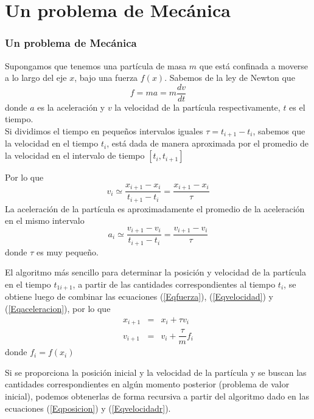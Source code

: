 \section{Un problema de Mec\'{a}nica}
\begin{frame}
\frametitle{Un problema de Mec\'{a}nica}
Supongamos que tenemos una part\'{i}cula de masa $m$ que est\'{a} confinada a moverse a lo largo del eje $x$, bajo una fuerza $f(x)$. Sabemos de la ley de Newton que
\begin{equation}\label{Eqfuerza}
f = ma = m \dfrac{dv}{dt}
\end{equation}
donde $a$ es la aceleraci\'{o}n y $v$ la velocidad de la part\'{i}cula respectivamente, $t$ es el tiempo.
\\
\medskip
Si dividimos el tiempo en pequeños intervalos iguales $\tau = t_{i+1} - t_{i}$, sabemos que la velocidad en el tiempo $t_{i}$, est\'{a} dada de manera aproximada por el promedio de la velocidad en el intervalo de tiempo $[t_{i}, t_{i+1}]$
\end{frame}
\begin{frame}
Por lo que
\begin{equation}\label{Eqvelocidad}
v_{i} \simeq \dfrac{x_{i+1}-x_{i}}{t_{i+1}-t_{i}} = \dfrac{x_{i+1}-x_{i}}{\tau}
\end{equation}
La aceleraci\'{o}n de la part\'{i}cula es aproximadamente el promedio de la aceleraci\'{o}n en el mismo intervalo
\begin{equation}\label{Eqaceleracion}
a_{i} \simeq \dfrac{v_{i+1}-v_{i}}{t_{i+1}-t_{i}} = \dfrac{v_{i+1}-v_{i}}{\tau}
\end{equation}
donde $\tau$ es muy pequeño.
\end{frame}
\begin{frame}
El algoritmo m\'{a}s sencillo para determinar la posici\'{o}n y velocidad de la part\'{i}cula en el tiempo $t_{1i+1}$, a partir de las cantidades correspondientes al tiempo $t_{i}$, se obtiene luego de combinar las ecuaciones (\ref{Eqfuerza}), (\ref{Eqvelocidad}) y (\ref{Eqaceleracion}), por lo que
\begin{eqnarray}
x_{i+1} &=& x_{i} + \tau v_{i} \label{Eqposicion} \\
v_{i+1} &=& v_{i} + \dfrac{\tau}{m} f_{i} \label{Eqvelocidadr}
\end{eqnarray}
donde $f_{i} = f(x_{i})$
\end{frame}
\begin{frame}
Si se proporciona la posici\'{o}n inicial y la velocidad de la part\'{i}cula y se buscan las cantidades correspondientes en alg\'{u}n momento posterior (problema de valor inicial), podemos obtenerlas de forma recursiva a partir del algoritmo dado en las ecuaciones (\ref{Eqposicion}) y (\ref{Eqvelocidadr}).
\end{frame}
